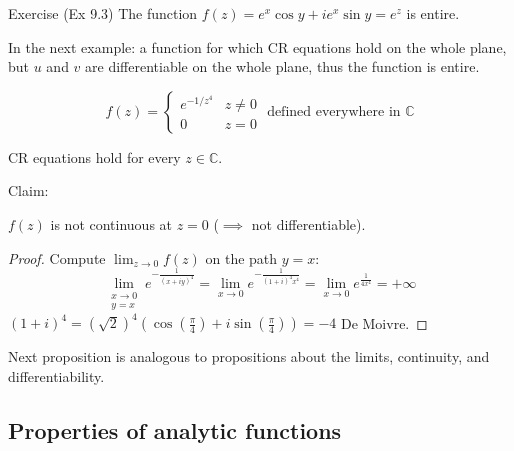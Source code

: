Exercise (Ex 9.3) The function $f(z) = e^x \cos y + ie^x \sin y = e^z$ is entire.

In the next example: a function for which CR equations hold on the whole plane, but $u$ and $v$ are  differentiable on the whole plane, thus the function is  entire.

\begin{example}\label{example:9.4}
\[ 
f(z) = \begin{cases}
e^{-1/z^4} & z \neq 0 \\
0 & z = 0
\end{cases}
\text{ defined everywhere in } \mathbb{C} 
\]

\checkthis CR equations hold for every $z \in \mathbb{C}$.
\end{example}
Claim:
\begin{claim} $f(z)$ is not continuous at $z = 0$ ($\implies$ not differentiable).

    \begin{proof}
 Compute $\lim_{z \to 0} f(z)$ on the path $y = x$:
\[ \lim_{\substack{x \to 0 \\ y = x}} e^{-\frac{1}{(x+iy)^4}} = \lim_{x \to 0} e^{-\frac{1}{(1+i)^4 x^4}} = \lim_{x \to 0} e^{\frac{1}{4x^4}} = +\infty \]
$(1 + i)^4 = (\sqrt{2})^4 (\cos(\frac{\pi}{4}) + i\sin(\frac{\pi}{4})) = -4$ De Moivre.
    \end{proof}
\end{claim}
Next proposition is analogous to propositions about the limits, continuity, and differentiability.

\subsection{Properties of analytic functions}

